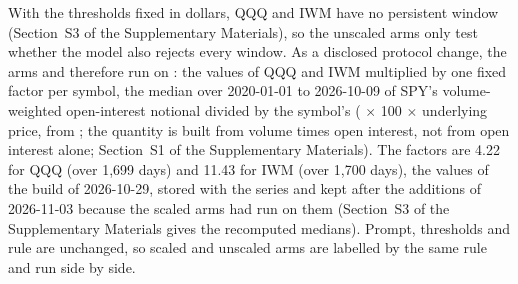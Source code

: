 With the thresholds fixed in dollars, QQQ and IWM have no persistent window (Section~S3 of the Supplementary Materials), so the unscaled arms only test whether the model also rejects every window. As a disclosed protocol change, the arms  and  therefore run on : the  values of QQQ and IWM multiplied by one fixed factor per symbol, the median over 2020-01-01 to 2026-10-09 of SPY's volume-weighted open-interest notional divided by the symbol's ( $\times$ 100 $\times$ underlying price, from ; the quantity is built from volume times open interest, not from open interest alone; Section~S1 of the Supplementary Materials). %
The factors are 4.22 for QQQ (over 1{,}699 days) and 11.43 for IWM (over 1{,}700 days), the values of the build of 2026-10-29, stored with the series and kept after the additions of 2026-11-03 because the scaled arms had run on them (Section~S3 of the Supplementary Materials gives the recomputed medians).
Prompt, thresholds and rule are unchanged, so scaled and unscaled arms are labelled by the same rule and run side by side.

